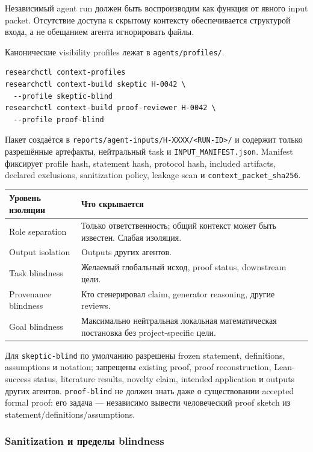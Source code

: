 \documentclass[11pt,a4paper]{article}
\begin{document}
\begin{principle}
Независимый agent run должен быть воспроизводим как функция от явного input packet. Отсутствие доступа к скрытому контексту обеспечивается структурой входа, а не обещанием агента игнорировать файлы.
\end{principle}

Канонические visibility profiles лежат в \texttt{agents/profiles/}.

\begin{lstlisting}
researchctl context-profiles
researchctl context-build skeptic H-0042 \
  --profile skeptic-blind
researchctl context-build proof-reviewer H-0042 \
  --profile proof-blind
\end{lstlisting}

Пакет создаётся в \texttt{reports/agent-inputs/H-XXXX/<RUN-ID>/} и содержит только разрешённые артефакты, нейтральный task и \texttt{INPUT\_MANIFEST.json}. Manifest фиксирует profile hash, statement hash, protocol hash, included artifacts, declared exclusions, sanitization policy, leakage scan и \texttt{context\_packet\_sha256}.

\begin{tabularx}{\textwidth}{@{}p{.25\textwidth}Y@{}}
\toprule
Уровень изоляции & Что скрывается \\
\midrule
Role separation & Только ответственность; общий контекст может быть известен. Слабая изоляция. \\
Output isolation & Outputs других агентов. \\
Task blindness & Желаемый глобальный исход, proof status, downstream цели. \\
Provenance blindness & Кто сгенерировал claim, generator reasoning, другие reviews. \\
Goal blindness & Максимально нейтральная локальная математическая постановка без project-specific цели. \\
\bottomrule
\end{tabularx}

Для \texttt{skeptic-blind} по умолчанию разрешены frozen statement, definitions, assumptions и notation; запрещены existing proof, proof reconstruction, Lean-success status, literature results, novelty claim, intended application и outputs других агентов. \texttt{proof-blind} не должен знать даже о существовании accepted formal proof: его задача --- независимо вывести человеческий proof sketch из statement/definitions/assumptions.

\subsubsection{Sanitization и пределы blindness}
\end{document}
